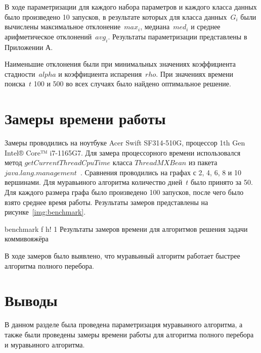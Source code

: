 В ходе параметризации для каждого набора параметров и каждого класса данных было произведено 10 запусков, в результате которых для класса данных~$G_i$ были вычислены максимальное отклонение~$max_i$, медиана~$med_i$ и среднее арифметическое отклонений~$avg_i$. Результаты параметризации представлены в Приложении А.

Наименьшие отклонения были при минимальных значениях коэффициента стадности~$alpha$ и коэффициента испарения~$rho$. При значениях времени поиска~$t$ 100 и 500 во всех случаях было найдено оптимальное решение.

\section{Замеры времени работы}

Замеры проводились на ноутбуке Acer Swift SF314-510G, процессор 1th Gen Intel® Core™ i7-1165G7. Для замера процессорного времени использовался метод $getCurrentThreadCpuTime$ класса $ThreadMXBean$ из пакета $java.lang.management$~\cite{tmxb}. Сравнения проводились на графах с 2, 4, 6, 8 и 10 вершинами. Для муравьиного алгоритма количество дней~$t$ было принято за 50. Для каждого размера графа было произведено 100 запусков, после чего было взято среднее время работы. Результаты замеров представлены на рисунке~\ref{img:benchmark}.

\FloatBarrier
{}
{benchmark} %
{f} %
{h!} %
{1\textwidth} %
{Результаты замеров времени для алгоритмов решения задачи коммивояжёра} %
\FloatBarrier

В ходе замеров было выявлено, что муравьиный алгоритм работает быстрее алгоритма полного перебора.

\section{Выводы}

В данном разделе была проведена параметризация муравьиного алгоритма, а также были проведены замеры времени работы для алгоритма полного перебора и муравьиного алгоритма.